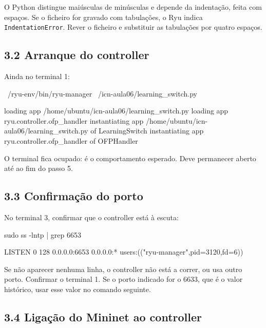 \documentclass[11pt,a4paper]{article}
\newcommand{\cmd}[1]{\texttt{#1}}
\begin{document}
\begin{erro}
O Python distingue maiúsculas de minúsculas e depende da indentação, feita com espaços. Se o ficheiro for gravado com tabulações, o Ryu indica \cmd{IndentationError}. Rever o ficheiro e substituir as tabulações por quatro espaços.
\end{erro}

\subsection*{3.2 Arranque do controller}

Ainda no terminal 1:

\begin{terminal}
~/ryu-env/bin/ryu-manager ~/icn-aula06/learning_switch.py
\end{terminal}

\begin{saida}
loading app /home/ubuntu/icn-aula06/learning_switch.py
loading app ryu.controller.ofp_handler
instantiating app /home/ubuntu/icn-aula06/learning_switch.py of LearningSwitch
instantiating app ryu.controller.ofp_handler of OFPHandler
\end{saida}

O terminal fica ocupado: é o comportamento esperado. Deve permanecer aberto até ao fim do passo 5.

\subsection*{3.3 Confirmação do porto}

No terminal 3, confirmar que o controller está à escuta:

\begin{terminal}
sudo ss -lntp | grep 6653
\end{terminal}

\begin{saida}
LISTEN 0  128  0.0.0.0:6653  0.0.0.0:*  users:(("ryu-manager",pid=3120,fd=6))
\end{saida}

\begin{erro}
Se não aparecer nenhuma linha, o controller não está a correr, ou usa outro porto. Confirmar o terminal 1. Se o porto indicado for o 6633, que é o valor histórico, usar esse valor no comando seguinte.
\end{erro}

\subsection*{3.4 Ligação do Mininet ao controller}
\end{document}
